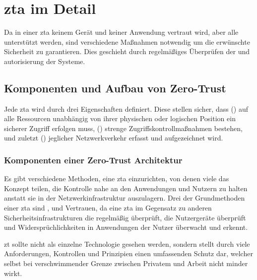 \newpage
\section[Zero-Trust Architektur im Detail]{\ac{zta} im Detail}\label{sec:zta-im-detail}
Da in einer \ac{zta} keinem Gerät und keiner Anwendung vertraut wird, aber alle unterstützt werden, sind verschiedene Maßnahmen notwendig um die erwünschte Sicherheit zu garantieren.
Dies geschieht durch regelmäßiges Überprüfen der  und \gls{autorisierung} der Systeme.\autocite[\vglf][]{dsilvia-2021}

\subsection{Komponenten und Aufbau von Zero-Trust}\label{subsec:komponenten-und-aufbau-von-zero-trust}
Jede \ac{zta} wird durch drei Eigenschaften definiert.
Diese stellen sicher, dass () auf alle Ressourcen unabhängig von ihrer physischen oder logischen Position ein sicherer Zugriff erfolgen muss, () strenge Zugriffskontrollmaßnahmen bestehen, und zuletzt () jeglicher Netzwerkverkehr erfasst und aufgezeichnet wird.\autocite[\vglf][]{dsilvia-2021}

\subsubsection{Komponenten einer Zero-Trust Architektur}
Es gibt verschiedene Methoden, eine \ac{zta} einzurichten, von denen viele das Konzept teilen, die Kontrolle nahe an den Anwendungen und Nutzern zu halten anstatt sie in der Netzwerkinfrastruktur auszulagern.\autocite[\vglf][]{buck-2021}
Drei der Grundmethoden einer \ac{zta} sind ,  und Vertrauen, da eine \ac{zta} im Gegensatz zu anderen Sicherheitsinfrastrukturen die  regelmäßig überprüft, die Nutzergeräte überprüft und Widersprüchlichkeiten in Anwendungen der Nutzer überwacht und erkennt.\autocite[\vglf][]{dsilvia-2021}

\ac{zt} sollte nicht als einzelne Technologie gesehen werden, sondern stellt durch viele Anforderungen, Kontrollen und Prinzipien einen umfassenden Schutz dar, welcher selbst bei verschwimmender Grenze zwischen Privatem und Arbeit nicht minder wirkt.\autocite[\vglf][Was sind die Komponenten von Zero Trust]{akamai:online}

